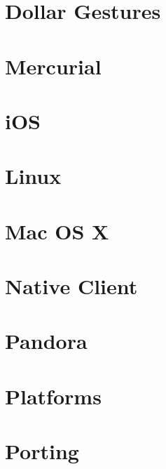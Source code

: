 \let\mypdfximage\pdfximage\def\pdfximage{\immediate\mypdfximage}\documentclass[twoside]{book}
\newcommand{\+}{\discretionary{\mbox{\scriptsize$\hookleftarrow$}}{}{}}
\begin{document}
\chapter{Dollar Gestures}
\label{md__s_d_l_docs__r_e_a_d_m_e-gesture}

\chapter{Mercurial}
\label{md__s_d_l_docs__r_e_a_d_m_e-hg}

\chapter{i\+OS}
\label{md__s_d_l_docs__r_e_a_d_m_e-ios}

\chapter{Linux}
\label{md__s_d_l_docs__r_e_a_d_m_e-linux}

\chapter{Mac OS X}
\label{md__s_d_l_docs__r_e_a_d_m_e-macosx}

\chapter{Native Client}
\label{md__s_d_l_docs__r_e_a_d_m_e-nacl}

\chapter{Pandora}
\label{md__s_d_l_docs__r_e_a_d_m_e-pandora}

\chapter{Platforms}
\label{md__s_d_l_docs__r_e_a_d_m_e-platforms}

\chapter{Porting}
\label{md__s_d_l_docs__r_e_a_d_m_e-porting}

\end{document}
